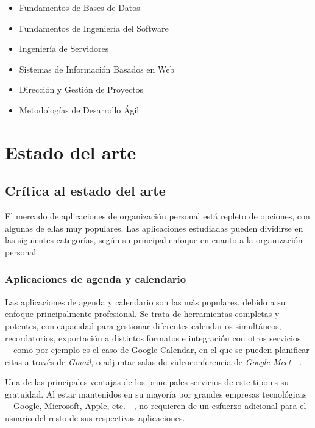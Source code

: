 \documentclass[10pt, a4paper]{aqademic}
\begin{document}
\begin{itemize}
	\item Fundamentos de Bases de Datos
	\item Fundamentos de Ingeniería del Software
	\item Ingeniería de Servidores
	\item Sistemas de Información Basados en Web
	\item Dirección y Gestión de Proyectos
	\item Metodologías de Desarrollo Ágil
\end{itemize}

\chapter{Estado del arte}

\section{Crítica al estado del arte}

El mercado de aplicaciones de organización personal está repleto de opciones, con algunas de ellas muy populares. Las aplicaciones estudiadas pueden dividirse en las siguientes categorías, según su principal enfoque en cuanto a la organización personal

\subsection*{Aplicaciones de agenda y calendario}

Las aplicaciones de agenda y calendario son las más populares, debido a su enfoque principalmente profesional. Se trata de herramientas completas y potentes, con capacidad para gestionar diferentes calendarios simultáneos, recordatorios, exportación a distintos formatos e integración con otros servicios ---como por ejemplo es el caso de Google Calendar, en el que se pueden planificar citas a través de \textit{Gmail}, o adjuntar salas de videoconferencia de \textit{Google Meet}---. 

\medskip

Una de las principales ventajas de los principales servicios de este tipo es su gratuidad. Al estar mantenidos en su mayoría por grandes empresas tecnológicas ---Google, Microsoft, Apple, etc.---, no requieren de un esfuerzo adicional para el usuario del resto de sus respectivas aplicaciones.

\medskip
\end{document}
